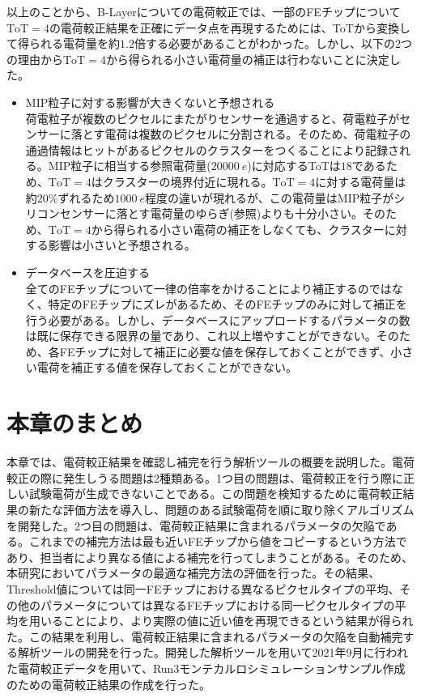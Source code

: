 以上のことから、B-Layerについての電荷較正では、一部のFEチップについて$\mathrm{ToT}=4$の電荷較正結果を正確にデータ点を再現するためには、ToTから変換して得られる電荷量を約$1.2$倍する必要があることがわかった。しかし、以下の2つの理由から$\mathrm{ToT}=4$から得られる小さい電荷量の補正は行わないことに決定した。
\begin{itemize}
  \item MIP粒子に対する影響が大きくないと予想される\\
  荷電粒子が複数のピクセルにまたがりセンサーを通過すると、荷電粒子がセンサーに落とす電荷は複数のピクセルに分割される。そのため、荷電粒子の通過情報はヒットがあるピクセルのクラスターをつくることにより記録される。MIP粒子に相当する参照電荷量($20000\ \si{e}$)に対応するToTは$18$であるため、$\mathrm{ToT}=4$はクラスターの境界付近に現れる。$\mathrm{ToT}=4$に対する電荷量は約$20\%$ずれるため$1000\ \si{e}$程度の違いが現れるが、この電荷量はMIP粒子がシリコンセンサーに落とす電荷量のゆらぎ(参照)よりも十分小さい。そのため、$\mathrm{ToT}=4$から得られる小さい電荷の補正をしなくても、クラスターに対する影響は小さいと予想される。
  \item データベースを圧迫する\\
  全てのFEチップについて一律の倍率をかけることにより補正するのではなく、特定のFEチップにズレがあるため、そのFEチップのみに対して補正を行う必要がある。しかし、データベースにアップロードするパラメータの数は既に保存できる限界の量であり、これ以上増やすことができない。そのため、各FEチップに対して補正に必要な値を保存しておくことができず、小さい電荷を補正する値を保存しておくことができない。
\end{itemize}

\section{本章のまとめ}
本章では、電荷較正結果を確認し補完を行う解析ツールの概要を説明した。電荷較正の際に発生しうる問題は2種類ある。1つ目の問題は、電荷較正を行う際に正しい試験電荷が生成できないことである。この問題を検知するために電荷較正結果の新たな評価方法を導入し、問題のある試験電荷を順に取り除くアルゴリズムを開発した。2つ目の問題は、電荷較正結果に含まれるパラメータの欠陥である。これまでの補完方法は最も近いFEチップから値をコピーするという方法であり、担当者により異なる値による補完を行ってしまうことがある。そのため、本研究においてパラメータの最適な補完方法の評価を行った。その結果、Threshold値については同一FEチップにおける異なるピクセルタイプの平均、その他のパラメータについては異なるFEチップにおける同一ピクセルタイプの平均を用いることにより、より実際の値に近い値を再現できるという結果が得られた。この結果を利用し、電荷較正結果に含まれるパラメータの欠陥を自動補完する解析ツールの開発を行った。開発した解析ツールを用いて2021年9月に行われた電荷較正データを用いて、Run3モンテカルロシミュレーションサンプル作成のための電荷較正結果の作成を行った。

